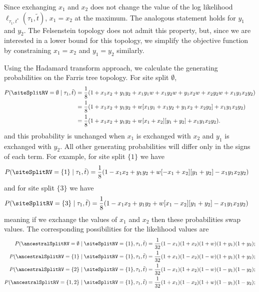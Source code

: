 Since exchanging $x_1$ and $x_2$ does not change the value of the log likelihood $\ell_{\tau_1,t^*}(\tau_1, \tilde{t})$, $x_1=x_2$ at the maximum.
The analogous statement holds for $y_1$ and $y_2$.
The Felsenstein topology does not admit this property, but, since we are interested in a lower bound for this topology, we simplify the objective function by constraining $x_1=x_2$ and $y_1=y_2$ similarly.

Using the Hadamard transform approach, we calculate the generating probabilities on the Farris tree topology.
For site split $\emptyset$,
\begin{align*}
    P(\siteSplitRV=\emptyset\mid \tau_1, \tilde{t}) & = \frac{1}{8} (1 + x_1x_2 +  y_1y_2 +  x_1y_1w + x_1y_2w + y_1x_2w + x_2y_2w + x_1y_1x_2y_2) \\
                                              & = \frac{1}{8} (1 + x_1x_2 +  y_1y_2 +  w[x_1y_1 + x_1y_2 + y_1x_2 + x_2y_2] + x_1y_1x_2y_2) \\
                                              & = \frac{1}{8} (1 + x_1x_2 +  y_1y_2 +  w[x_1 + x_2][y_1 + y_2] + x_1y_1x_2y_2).
\end{align*}
and this probability is unchanged when $x_1$ is exchanged with $x_2$ and $y_1$ is exchanged with $y_2$.
All other generating probabilities will differ only in the signs of each term.
For example, for site split $\{1\}$ we have
\begin{align*}
    P(\siteSplitRV=\{1\}\mid \tau_1, \tilde{t}) & = \frac{1}{8} (1 - x_1x_2 +  y_1y_2 +  w[-x_1 + x_2][y_1 + y_2] - x_1y_1x_2y_2)
\end{align*}
and for site split $\{3\}$ we have
\begin{align*}
    P(\siteSplitRV=\{3\}\mid \tau_1, \tilde{t}) & = \frac{1}{8} (1 - x_1x_2 +  y_1y_2 +  w[x_1 - x_2][y_1 + y_2] - x_1y_1x_2y_2)
\end{align*}
meaning if we exchange the values of $x_1$ and $x_2$ then these probabilities swap values.
The corresponding possibilities for the likelihood values are
\begin{align*}
    P(\ancestralSplitRV=\emptyset \mid \siteSplitRV=\{1\}, \tau_1, \tilde{t}) &= \frac{1}{32}(1-x_1)(1+x_2)(1+w)(1+y_1)(1+y_2); \\
    P(\ancestralSplitRV=\{1\} \mid \siteSplitRV=\{1\}, \tau_1, \tilde{t}) &= \frac{1}{32}(1+x_1)(1-x_2)(1-w)(1+y_1)(1+y_2); \\
    P(\ancestralSplitRV=\{2\} \mid \siteSplitRV=\{1\}, \tau_1, \tilde{t}) &= \frac{1}{32}(1-x_1)(1+x_2)(1-w)(1-y_1)(1-y_2); \\
    P(\ancestralSplitRV=\{1,2\} \mid \siteSplitRV=\{1\}, \tau_1, \tilde{t}) &= \frac{1}{32}(1+x_1)(1-x_2)(1+w)(1-y_1)(1-y_2);
\end{align*}
